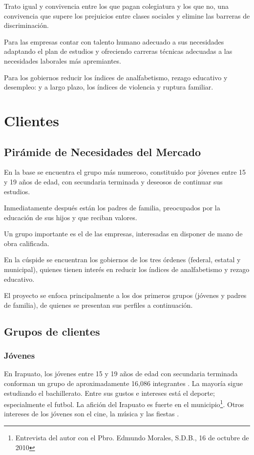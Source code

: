 Trato igual y convivencia entre los que pagan colegiatura y los que no, una convivencia que supere los prejuicios entre clases sociales y elimine las barreras de discriminación.

Para las empresas contar con talento humano adecuado a sus necesidades adaptando el plan de estudios y ofreciendo carreras técnicas adecuadas a las necesidades laborales más apremiantes.

Para los gobiernos reducir los índices de analfabetismo, rezago educativo y desempleo: y a largo plazo, los índices de violencia y ruptura familiar.

\section{Clientes}
\label{sec:Clientes}

\subsection{Pirámide de Necesidades del Mercado}

En la base se encuentra el grupo más numeroso, constituido por jóvenes entre 15 y 19 años de edad, con secundaria terminada y deseosos de continuar sus estudios.

Inmediatamente después están los padres de familia, preocupados por la educación de sus hijos y que reciban valores.

Un grupo importante es el de las empresas, interesadas en disponer de mano de obra calificada.

En la cúspide se encuentran los gobiernos de los tres órdenes (federal, estatal y municipal), quienes tienen interés en reducir los índices de analfabetismo y rezago educativo.

El proyecto se enfoca principalmente a los dos primeros grupos (jóvenes y padres de familia), de quienes se presentan sus perfiles a continuación.

\subsection{Grupos de clientes}

\subsubsection{Jóvenes}

En Irapuato, los j\'ovenes entre 15 y 19 a\~nos de edad con secundaria terminada conforman un grupo de aproximadamente 16,086 integrantes \citep{Inegi2005}. La mayor\'{i}a sigue estudiando el bachillerato. Entre sus gustos e intereses est\'a el deporte; especialmente el futbol. La afici\'on del Irapuato es fuerte en el municipio\footnote{Entrevista del autor con el Pbro. Edmundo Morales, S.D.B., 16 de octubre de 2010}. Otros intereses de los j\'ovenes son el cine, la m\'usica y las fiestas \citep{Cordero07}.

